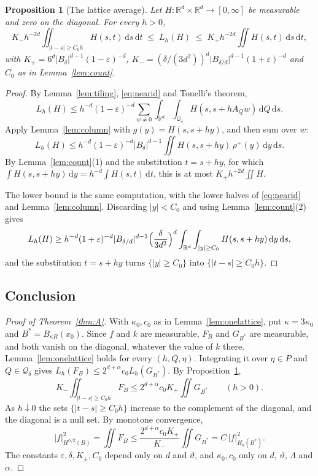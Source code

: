 \documentclass[11pt]{amsart}
\newtheorem{proposition}[lemma]{Proposition}
\theoremstyle{remark}
\newcommand{\R}{\mathbb{R}}
\newcommand{\dd}{\,\mathrm{d}}
\newcommand{\abs}[1]{\lvert #1\rvert}
\newcommand{\norm}[1]{\lvert #1\rvert}
\newcommand{\1}{\mathbf{1}}
\newcommand{\Qd}{\mathcal{Q}_\delta}
\begin{document}
\begin{proposition}[The lattice average]\label{prop:avg}
Let $H\colon\R^d\times\R^d\to[0,\infty]$ be measurable and zero on the diagonal. For every $h>0$,
\[
  K_-h^{-2d}\iint_{\norm{t-s}\ge C_0h}H(s,t)\dd s\dd t\;\le\;L_h(H)\;\le\;K_+h^{-2d}\iint H(s,t)\dd s\dd t,
\]
with $K_+=6^d\abs{B_\delta}^{d-1}(1-\varepsilon)^{-d}$,
$K_-=(\delta/(3d^2))^d\abs{B_{\delta/d}}^{d-1}(1+\varepsilon)^{-d}$ and $C_0$ as in
Lemma~\ref{lem:count}.
\end{proposition}

\begin{proof}
By Lemma~\ref{lem:tiling}, \eqref{eq:nearid} and Tonelli's theorem,
\[
  L_h(H)\le h^{-d}(1-\varepsilon)^{-d}\sum_{w\ne0}\int_{\R^d}\int_{\Qd}H(s,s+hA_Qw)\dd Q\dd s .
\]
Apply Lemma~\ref{lem:column} with $g(y)=H(s,s+hy)$, and then sum over $w$:
\[
  L_h(H)\le h^{-d}(1-\varepsilon)^{-d}\abs{B_\delta}^{d-1}\iint H(s,s+hy)\,\rho^+(y)\dd y\dd s .
\]
By Lemma~\ref{lem:count}(1) and the substitution $t=s+hy$, for which
$\int H(s,s+hy)\dd y=h^{-d}\int H(s,t)\dd t$, this is at most $K_+h^{-2d}\iint H$.

The lower bound is the same computation, with the lower halves of \eqref{eq:nearid} and
Lemma~\ref{lem:column}. Discarding $\norm y<C_0$ and using Lemma~\ref{lem:count}(2) gives
\[
  L_h(H)\ge h^{-d}(1+\varepsilon)^{-d}\abs{B_{\delta/d}}^{d-1}\Bigl(\frac\delta{3d^2}\Bigr)^d
  \int_{\R^d}\int_{\norm y\ge C_0}H(s,s+hy)\dd y\dd s,
\]
and the substitution $t=s+hy$ turns $\{\norm y\ge C_0\}$ into $\{\norm{t-s}\ge C_0h\}$.
\end{proof}

\subsection{Conclusion}

\begin{proof}[Proof of Theorem~\ref{thm:A}]
With $\kappa_0,c_0$ as in Lemma~\ref{lem:onelattice},
put $\kappa=3\kappa_0$ and $B^*=B_{\kappa R}(x_0)$. Since $f$ and $k$ are measurable, $F_B$ and
$G_{B^*}$ are measurable, and both vanish on the diagonal, whatever the value of $k$ there. Lemma~\ref{lem:onelattice} holds for
every $(h,Q,\eta)$. Integrating it over $\eta\in P$ and $Q\in\Qd$ gives
$L_h(F_B)\le2^{d+\alpha}c_0L_h(G_{B^*})$. By Proposition~\ref{prop:avg},
\[
  K_-\iint_{\norm{t-s}\ge C_0h}F_B\le2^{d+\alpha}c_0K_+\iint G_{B^*}\qquad(h>0).
\]
As $h\downarrow0$ the sets $\{\norm{t-s}\ge C_0h\}$ increase to the complement of the diagonal,
and the diagonal is a null set. By monotone convergence,
\[
  \abs{f}^2_{H^{\alpha/2}(B)}=\iint F_B\le\frac{2^{d+\alpha}c_0K_+}{K_-}\iint G_{B^*}
  =C\,\abs{f}^2_{H_k(B^*)} .
\]
The constants $\varepsilon,\delta,K_\pm,C_0$ depend only on $d$ and $\vartheta$, and $\kappa_0,c_0$
only on $d$, $\vartheta$, $\Lambda$ and $\alpha$.
\end{proof}
\end{document}
